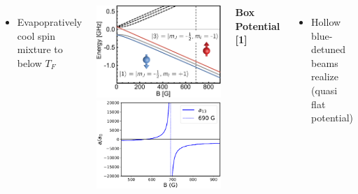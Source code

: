 \documentclass[26pt, paperwidth=36in,paperheight=48in]{tikzposter} %
\newcommand{\myfont}{\fontsize{24}{30}\selectfont}
\begin{document}
\begin{columns}
{\begin{minipage}{0.16\textwidth}
\begin{itemize}
		\item Evapopratively cool spin mixture to below $T_F$
	\end{itemize}
\vspace{2cm}
\end{minipage}
\hspace{0.25cm}
\begin{minipage}{0.15\textwidth}
	\centering
	\includegraphics[width=1.1\textwidth]{figures/BreitRabiLi6.pdf}
	\centering
	\includegraphics[width=1.1\textwidth]{figures/Feshbach_Plot.eps}
\end{minipage}



\vspace{0.3cm}
\begin{minipage}{0.13\textwidth}
	\textbf{Box Potential [1]}
	\vspace{1cm}
	\myfont
	\begin{itemize}
		\item Hollow blue-detuned beams realize (quasi flat potential)
		

\end{itemize}
\end{minipage}}
\end{columns}
\end{document}
